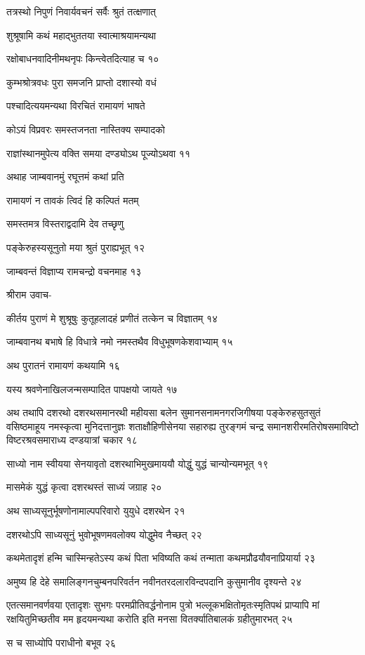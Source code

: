 तत्रस्थो निपुणं निवार्यवचनं सर्वैः श्रुतं तत्क्षणात्

शुश्रूषामि कथं महाद्भुततया स्वात्माश्रयामन्यथा

रक्षोबाधनवादिनीमथनृपः किन्त्वेतदित्याह च १०

कुम्भश्रोत्रवधः पुरा समजनि प्राप्तो दशास्यो वधं

पश्चादित्ययमन्यथा विरचितं रामायणं भाषते

कोऽयं विप्रवरः समस्तजनता नास्तिक्य सम्पादको

राज्ञांस्थानमुपेत्य वक्ति समया दण्ड्योऽथ पूज्योऽथवा ११

अथाह जाम्बवानमुं रघूत्तमं कथां प्रति

रामायणं न तावकं त्विदं हि कल्पितं मतम्

समस्तमत्र विस्तराद्वदामि देव तच्छृणु

पङ्केरुहस्यसूनुतो मया श्रुतं पुराह्यभूत् १२

जाम्बवन्तं विज्ञाप्य रामचन्द्रो वचनमाह १३

श्रीराम उवाच-

कीर्तय पुराणं मे शुश्रूषुः कुतूहलादहं प्रणीतं तत्केन च विज्ञातम् १४

जाम्बवानथ बभाषे हि विधात्रे नमो नमस्तथैव विधुभूषणकेशवाभ्याम् १५

अथ पुरातनं रामायणं कथयामि १६

यस्य श्रवणेनाखिलजन्मसम्पादित पापक्षयो जायते १७

अथ तथापि दशरथो दशरथसमानरथी महीयसा बलेन सुमानसनामनगरजिगीषया पङ्केरुहसुतसुतं
वसिष्ठमाहूय नमस्कृत्वा मुनिदत्तानुज्ञः शताक्षौहिणीसेनया सहारुह्य तुरङ्गमं चन्द्र
समानशरीरमतिरोषसमाविष्टो विष्टरश्रवसमाराध्य दण्डयात्रां चकार १८

साध्यो नाम स्वीयया सेनयावृतो दशरथाभिमुखमाययौ योद्धुं युद्धं चान्योन्यमभूत् १९

मासमेकं युद्धं कृत्वा दशरथस्तं साध्यं जग्राह २०

अथ साध्यसूनुर्भूषणोनामाल्पपरिवारो युयुधे दशरथेन २१

दशरथोऽपि साध्यसूनुं भुवोभूषणमवलोक्य योद्धुमेव नैच्छत् २२

कथमेतादृशं हन्मि चास्मिन्हतेऽस्य कथं पिता भविष्यति कथं तन्माता कथमप्रौढयौवनाप्रियार्या
 २३

अमुष्य हि देहे समालिङ्गनचुम्बनपरिवर्तन नवीनतरदलारविन्दपदानि कुसुमानीव दृश्यन्ते २४

एतत्समानवर्णवया एतादृशः सुभगः परमप्रीतिवर्द्धनोनाम पुत्रो भल्लूकभक्षितोमृतःस्मृतिपथं
प्राप्यापि मां रक्षयितुमिच्छतीव मम हृदयमन्यथा करोति इति मनसा वितर्क्यातिबालकं
ग्रहीतुमारभत् २५

स च साध्योपि पराधीनो बभूव २६

